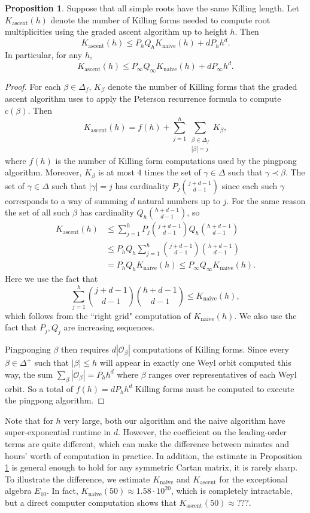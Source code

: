 \documentclass[12pt]{article}
\newcommand{\Knaive}{K_{\text{naive}}}
\newcommand{\Kascent}{K_{\text{ascent}}}
\theoremstyle{definition}
\newtheorem{prop}[theorem]{Proposition}
\begin{document}
\begin{prop}
    \label{kascent}
    Suppose that all simple roots have the same Killing length. Let $\Kascent(h)$ denote the number of Killing forms needed to compute root multiplicities using the graded ascent algorithm up to height $h$. Then
    $$\Kascent(h) \leq P_hQ_h\Knaive(h) + dP_hh^d.$$
    In particular, for any $h$,
    $$\Kascent(h) \leq P_\infty Q_\infty\Knaive(h) + dP_\infty h^d.$$
\end{prop}
\begin{proof}
    For each $\beta \in \Delta_f$, $K_\beta$ denote the number of Killing forms that the graded ascent algorithm uses to apply the Peterson recurrence formula to compute $c(\beta)$. Then
    $$\Kascent(h) = f(h) + \sum_{j=1}^h \sum_{\substack{\beta \in \Delta_f\\|\beta| = j}} K_\beta,$$
    where $f(h)$ is the number of Killing form computations used by the pingpong algorithm. Moreover, $K_\beta$ is at most $4$ times the set of $\gamma \in \Delta$ such that $\gamma \prec \beta$. The set of $\gamma \in \Delta$ such that $|\gamma| = j$ has cardinality $P_j\binom{j+d-1}{d-1}$ since each such $\gamma$ corresponds to a way of summing $d$ natural numbers up to $j$. For the same reason the set of all such $\beta$ has cardinality $Q_h\binom{h+d-1}{d-1}$, so
\begin{align*}
    \Kascent(h)
        &\leq \sum_{j=1}^h P_j \binom{j+d-1}{d-1} Q_h \binom{h+d-1}{d-1}\\
        &\leq P_h Q_h\sum_{j=1}^h \binom{j+d-1}{d-1}\binom{h+d-1}{d-1}\\
        &= P_hQ_h \Knaive(h) \leq P_\infty Q_\infty \Knaive(h).
\end{align*}
    Here we use the fact that
    $$\sum_{j=1}^h \binom{j+d-1}{d-1}\binom{h+d-1}{d-1} \leq \Knaive(h),$$
    which follows from the ``right grid" computation of $\Knaive(h)$. We also use the fact that $P_j,Q_j$ are increasing sequences.

    Pingponging $\beta$ then requires $d|\mathcal O_\beta|$ computations of Killing forms. Since every $\beta \in \Delta^+$ such that $|\beta| \leq h$ will appear in exactly one Weyl orbit computed this way, the sum $\sum_\beta |\mathcal O_\beta| = P_hh^d$ where $\beta$ ranges over representatives of each Weyl orbit. So a total of $f(h) = dP_hh^d$ Killing forms must be computed to execute the pingpong algorithm.
\end{proof}
    Note that for $h$ very large, both our algorithm and the naive algorithm have super-exponential runtime in $d$. However, the coefficient on the leading-order terms are quite different, which can make the difference between minutes and hours' worth of computation in practice. In addition, the estimate in Proposition \ref{kascent} is general enough to hold for any symmetric Cartan matrix, it is rarely sharp. To illustrate the difference, we estimate $\Knaive$ and $\Kascent$ for the exceptional algebra $E_{10}$. In fact, $\Knaive(50) \approx 1.58 \cdot 10^{20}$, which is completely intractable, but a direct computer computation shows that $\Kascent(50) \approx ???$.
    
\end{document}
